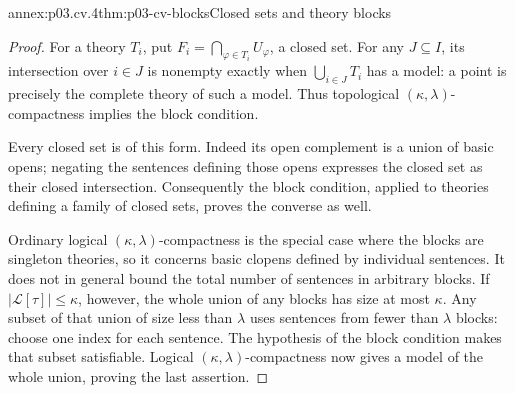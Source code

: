 \begin{annexitem}{annex:p03.cv.4}{thm:p03-cv-blocks}{Closed sets and theory blocks}
\begin{proof}
For a theory \(T_i\), put
\(F_i=\bigcap_{\varphi\in T_i}U_\varphi\), a closed set.
For any \(J\subseteq I\), its intersection over \(i\in J\)
is nonempty exactly when \(\bigcup_{i\in J}T_i\) has a model:
a point is precisely the complete theory of such a model.
Thus topological \((\kappa,\lambda)\)-compactness implies the
block condition.

Every closed set is of this form. Indeed its open complement is
a union of basic opens; negating the sentences defining those
opens expresses the closed set as their closed intersection.
Consequently the block condition, applied to theories defining
a family of closed sets, proves the converse as well.

Ordinary logical \((\kappa,\lambda)\)-compactness is the
special case where the blocks are singleton theories, so it
concerns basic clopens defined by individual sentences. It does
not in general bound the total number of sentences in arbitrary
blocks. If \(|\mathscr L[\tau]|\leq\kappa\), however, the
whole union of any blocks has size at most \(\kappa\).
Any subset of that union of size less than \(\lambda\) uses
sentences from fewer than \(\lambda\) blocks: choose one index
for each sentence. The hypothesis of the block condition makes
that subset satisfiable. Logical \((\kappa,\lambda)\)-compactness
now gives a model of the whole union, proving the last assertion.
\end{proof}
\end{annexitem}


